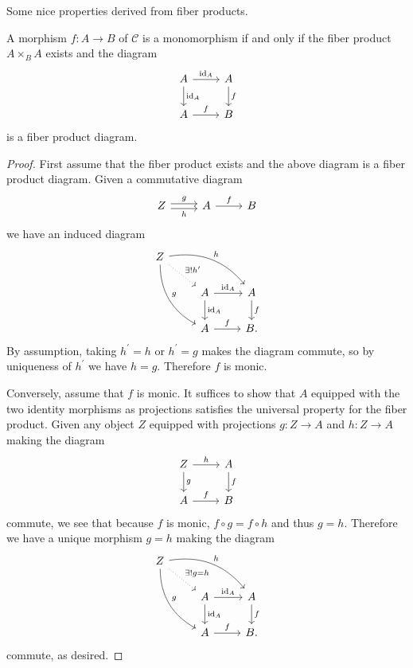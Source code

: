 \documentclass[dissertation.tex]{subfiles}
\begin{document}
Some nice properties derived from fiber products.

\begin{prop}\label{p.5}
  A morphism $f : A \rightarrow B$ of $\mathscr{C}$ is a monomorphism if and only if the fiber product $A \times_B A$ exists and the diagram
  $$\begin{tikzcd}
    A \arrow{d}{\operatorname{id}_A}\arrow{r}{\operatorname{id}_A} & A\arrow{d}{f}\\
    A\arrow{r}{f} & B
  \end{tikzcd}$$
  is a fiber product diagram.

  \begin{proof}
    First assume that the fiber product exists and the above diagram is a fiber product diagram.
    Given a commutative diagram
    $$\begin{tikzcd}
      Z \arrow[yshift=0.5ex]{r}{g} \arrow[yshift=-0.5ex,swap]{r}{h}& A \arrow{r}{f}& B
    \end{tikzcd}$$
    we have an induced diagram
    $$\begin{tikzcd}
      Z \arrow[bend right]{ddr}{g} \arrow[bend left]{rrd}{h} \arrow[dotted]{rd}{\exists !h^\prime}\\
      & A\arrow{d}{\operatorname{id}_A}\arrow{r}{\operatorname{id}_A} & A\arrow{d}{f}\\
      & A\arrow{r}{f} & B.
    \end{tikzcd}$$
    By assumption, taking $h^\prime = h$ or $h^\prime = g$ makes the diagram commute, so by uniqueness of $h^\prime$ we have $h = g$.
    Therefore $f$ is monic.

    Conversely, assume that $f$ is monic.
    It suffices to show that $A$ equipped with the two identity morphisms as projections satisfies the universal property for the fiber product.
    Given any object $Z$ equipped with projections $g : Z \rightarrow A$ and $h : Z \rightarrow A$ making the diagram
    $$\begin{tikzcd}
      Z \arrow{d}{g} \arrow{r}{h} & A\arrow{d}{f}\\
      A\arrow{r}{f} & B
    \end{tikzcd}$$
    commute, we see that because $f$ is monic,
    $f \circ g = f \circ h$
    and thus $g = h$.
    Therefore we have a unique morphism $g = h$ making the diagram
    $$\begin{tikzcd}
      Z \arrow[bend right]{ddr}{g} \arrow[bend left]{rrd}{h} \arrow[dotted]{rd}{\exists !g = h}\\
      & A\arrow{d}{\operatorname{id}_A}\arrow{r}{\operatorname{id}_A} & A\arrow{d}{f}\\
      & A\arrow{r}{f} & B.
    \end{tikzcd}$$
    commute, as desired.
  \end{proof}
\end{prop}
\end{document}
